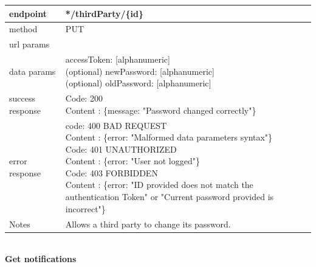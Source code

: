 \begin{legal}
\begin{legal}
\begin{itemize}
							\begin{tabularx}{\linewidth}{| l| l }
								\hline
								endpoint & */thirdParty/\{id\} \\
								\hline
								method & PUT \\
								\hline
								url params & \\
								\hline
								data params & 
								\parbox{0.7\textwidth}{
									\bigskip
									accessToken: [alphanumeric] \\
									(optional) newPassword: [alphanumeric]\\
									(optional) oldPassword:
									[alphanumeric]\\
									\bigskip
								} \\
								\hline
								success response &
								\parbox{0.7\textwidth}{
									\bigskip
									Code: 200\\
									Content : \{message: "Password changed correctly"\}
									\bigskip
								} \\
								\hline
								error response &
								\parbox{0.7\textwidth}{
									\bigskip
									code: 400 BAD REQUEST \\
									Content : \{error: "Malformed data parameters syntax"\}\\
									Code: 401 UNAUTHORIZED \\
									Content : \{error: "User not logged"\}\\
									Code: 403 FORBIDDEN \\
									Content : \{error: "ID provided does not match the authentication Token" or  "Current password provided is incorrect"\}\\
									\bigskip
								} \\
								\hline
								Notes & \parbox{0.7\textwidth}{
									\bigskip
									Allows a third party to change its password.
									\bigskip
								} \\
								\hline
							\end{tabularx}\\
							\newpage
							\textbf{Get notifications} \\
			

\end{itemize}
\end{legal}
\end{legal}
